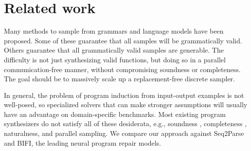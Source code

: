 \documentclass[runningheads]{llncs}
\begin{document}
\section{Related work}

Many methods to sample from grammars and language models have been proposed. Some of these guarantee that all samples will be grammatically valid. Others guarantee that all grammatically valid samples are generable. The difficulty is not just synthesizing valid functions, but doing so in a parallel communication-free manner, without compromising soundness or completeness. The goal should be to massively scale up a replacement-free discrete sampler.


In general, the problem of program induction from input-output examples is not well-posed, so specialized solvers that can make stronger assumptions will usually have an advantage on domain-specific benchmarks. Most existing program synthesizers do not satisfy all of these desiderata, e.g., soundness , completeness , naturalness, and parallel sampling. We compare our approach against Seq2Parse and BIFI, the leading neural program repair models.

\newcommand{\tidyparse}{\href{https://arxiv.org/pdf/2408.01849}{Tidyparse}~\cite{considine2023pragmatic}}
\newcommand{\seqtoparse}{\href{https://pg.ucsd.edu/publications/Seq2Parse-neurosymbolic-parse-error-repair_OOPSLA-2022.pdf}{Seq2Parse}~\cite{sakkas2022seq2parse}}
\newcommand{\bifi}{\href{https://arxiv.org/pdf/2106.06600}{BIFI}~\cite{yasunaga2021break}}
\newcommand{\ordinalfix}{\href{https://arxiv.org/pdf/2309.06771}{OrdinalFix}~\cite{zhang2023ordinalfix}}
\newcommand{\ahopeterson}{\href{https://epubs.siam.org/doi/10.1137/0201022}{Aho \& Peterson}~\cite{aho1972minimum}}
\newcommand{\diekmanntratt}{\href{https://arxiv.org/pdf/1804.07133}{Diekmann \& Tratt}~\cite{diekmann2018dont}}
\end{document}
